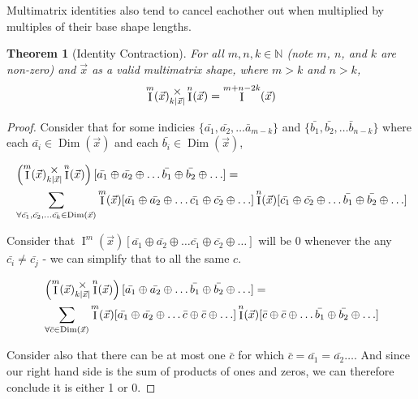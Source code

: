 \documentclass[12pt]{book}
\theoremstyle{plain}
\newtheorem{theorem}{Theorem}[chapter]
\theoremstyle{definition}
\theoremstyle{ppart}
\theoremstyle{case}
\theoremstyle{solution}
\DeclareMathOperator{\Dim}{Dim}
\DeclareMathOperator{\Ident}{I}
\newcommand{\mmult}[1]{\text{\raisebox{1ex}{$\underset{#1}{\times}$}}}
\newcommand{\shape}[1]{\left|#1\right|}
\begin{document}
Multimatrix identities also tend to cancel eachother out when multiplied by
multiples of their base shape lengths.

\begin{landscape}
\begin{theorem}[Identity Contraction]
For all $m, n, k \in \mathbb{N}$ (note $m$, $n$, and $k$ are non-zero) and $\vec{x}$ as a valid multimatrix shape,
where $m > k$ and $n > k$,
\[ \Ident^m(\vec{x}) \mmult{k\shape{\vec{x}}} \Ident^n(\vec{x}) = \Ident^{m+n-2k}(\vec{x}) \]
\end{theorem}
\begin{proof}
Consider that for some indicies
$\{\bar{a_1}, \bar{a_2}, \ldots \bar{a}_{m-k}\}$
and $\{\bar{b_1}, \bar{b_2}, \ldots \bar{b}_{n-k}\}$ where each
$\bar{a_i} \in \Dim(\vec{x})$ and each $\bar{b_i} \in \Dim(\vec{x})$,

\begin{align*}
&\left( \Ident^m(\vec{x}) \mmult{k\shape{\vec{x}}} \Ident^n(\vec{x}) \right)
[\bar{a_1} \oplus \bar{a_2} \oplus \ldots \bar{b_1} \oplus \bar{b_2} \oplus \ldots] = \\
&\sum_{\forall \bar{c_1}, \bar{c_2}, \ldots \bar{c_k} \in \Dim(\vec{x})}
\Ident^m(\vec{x})
[\bar{a_1} \oplus \bar{a_2} \oplus \ldots \bar{c_1} \oplus \bar{c_2} \oplus \ldots]
\Ident^n(\vec{x})
[\bar{c_1} \oplus \bar{c_2} \oplus \ldots \bar{b_1} \oplus \bar{b_2} \oplus \ldots]
\end{align*}

Consider that $\Ident^m(\vec{x})
[\bar{a_1} \oplus \bar{a_2} \oplus \ldots \bar{c_1} \oplus \bar{c_2} \oplus \ldots]$
will be 0 whenever the any $\bar{c_i} \ne \bar{c_j}$ - we can simplify that to all
the same $c$.

\begin{align*}
&\left( \Ident^m(\vec{x}) \mmult{k\shape{\vec{x}}} \Ident^n(\vec{x}) \right)
[\bar{a_1} \oplus \bar{a_2} \oplus \ldots \bar{b_1} \oplus \bar{b_2} \oplus \ldots] = \\
&\sum_{\forall \bar{c} \in \Dim(\vec{x})}
\Ident^m(\vec{x})
[\bar{a_1} \oplus \bar{a_2} \oplus \ldots \bar{c} \oplus \bar{c} \oplus \ldots]
\Ident^n(\vec{x})
[\bar{c} \oplus \bar{c} \oplus \ldots \bar{b_1} \oplus \bar{b_2} \oplus \ldots]
\end{align*}

Consider also that there can be at most one $\bar{c}$ for which
$\bar{c} = \bar{a_1} = \bar{a_2} \ldots$. And since our right hand side is
the sum of products of ones and zeros, we can therefore conclude it is either 1 or 0.


\end{proof}
\end{landscape}
\end{document}
